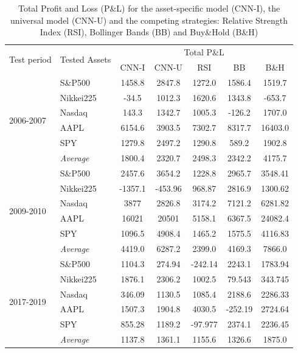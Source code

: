 \documentclass[11pt, a4paper]{article}
\begin{document}
\begin{table}[H]
\centering
\begin{tabular}{l|l|ccccc}
        \multicolumn{1}{m{1cm}|}{\multirow{2}{1cm}{Test period}} & \multicolumn{1}{m{1.5cm}|}{\multirow{2}{1.5cm}{Tested Assets}} &       \multicolumn{5}{c}{Total P\&L}  \\ \cline{3-7}
          &           & CNN-I   & CNN-U   & RSI     & BB      & B\&H    \\
          \hline \hline
\multirow{6}{1cm}{2006-2007} & S\&P500   & 1458.8  & 2847.8  & 1272.0  & 1586.4  & 1519.7    \\
          & Nikkei225 & -34.5   & 1012.3  & 1620.6  & 1343.8  & -653.7   \\
          & Nasdaq    & 143.3   & 1342.7  & 1005.3  & -126.2  & 1707.0 \\
          & AAPL      & 6154.6  & 3903.5  & 7302.7  & 8317.7  & 16403.0  \\
          & SPY       & 1279.8  & 2497.2  & 1290.8  & 589.2   & 1902.8 \\
          \cline{2-7}
          & \textit{Average}   & 1800.4  & 2320.7  & 2498.3  & 2342.2  & 4175.7 \\
          \hline
\multirow{6}{1cm}{2009-2010} & S\&P500   & 2457.6  & 3654.2  & 1228.8  & 2965.7  & 3548.41  \\
          & Nikkei225 & -1357.1 & -453.96 & 968.87  & 2816.9  & 1300.62  \\
          & Nasdaq    & 3877    & 2826.8  & 3174.2  & 7121.2  & 6281.82 \\
          & AAPL      & 16021   & 20501   & 5158.1  & 6367.5  & 24082.4 \\
          & SPY       & 1096.5  & 4908.4  & 1465.2  & 1575.5  & 4116.83\\
          \cline{2-7}
          & \textit{Average}   & 4419.0  & 6287.2  & 2399.0  & 4169.3  & 7866.0   \\
\hline
\multirow{6}{1cm}{2017-2019}   & S\&P500   & 1104.3  & 274.94  & -242.14 & 2243.1  & 1783.94 \\
          & Nikkei225 & 1876.1  & 2306.2  & 1002.5  & 79.543  & 343.745 \\
          & Nasdaq    & 346.09  & 1130.5  & 1085.4  & 2188.6  & 2286.33  \\
          & AAPL      & 1507.3  & 1904.8  & 4030.5  & -252.19 & 2724.64  \\
          & SPY       & 855.28  & 1189.2  & -97.977 & 2374.1  & 2236.45 \\
          \cline{2-7}
          & \textit{Average}   & 1137.8  & 1361.1  & 1155.6  & 1326.6  & 1875.0 
\end{tabular}
\caption{Total Profit and Loss (P\&L) for the asset-specific model (CNN-I), the universal model (CNN-U) and the competing strategies: Relative Strength Index (RSI), Bollinger Bands (BB) and Buy\&Hold (B\&H)}
\label{tbl:PandL}
\end{table}
\end{document}
